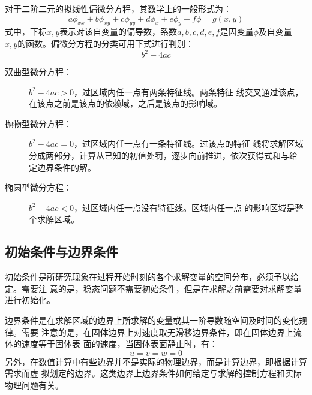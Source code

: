 对于二阶二元的拟线性偏微分方程，其数学上的一般形式为：
\begin{equation}
  a\phi_{xx} + b\phi_{xy} + c\phi_{yy} + d\phi_{x} + e\phi_{y} + f\phi = g(x,y)
\end{equation}
式中，下标$x,y$表示对该自变量的偏导数，系数$a,b,c,d,e,f$是因变量$\phi$及自变量
$x,y$的函数。偏微分方程的分类可用下式进行判别：
\begin{equation}
  b^{2} - 4ac
\end{equation}
\begin{description}
  \item  [双曲型微分方程：] $b^{2}-4ac>0$，过区域内任一点有两条特征线。两条特征
    线交叉通过该点，在该点之前是该点的依赖域，之后是该点的影响域。
  \item [抛物型微分方程：] $b^{2}-4ac=0$，过区域内任一点有一条特征线。过该点的特征
    线将求解区域分成两部分，计算从已知的初值处罚，逐步向前推进，依次获得式和与给
    定边界条件的解。
  \item [椭圆型微分方程：] $b^{2}-4ac<0$，过区域内任一点没有特征线。区域内任一点
    的影响区域是整个求解区域。
\end{description}

\subsection{初始条件与边界条件}
初始条件是所研究现象在过程开始时刻的各个求解变量的空间分布，必须予以给定。需要注
意的是，稳态问题不需要初始条件，但是在求解之前需要对求解变量进行初始化。

边界条件是在求解区域的边界上所求解的变量或其一阶导数随空间及时间的变化规律。需要
注意的是，在固体边界上对速度取无滑移边界条件，即在固体边界上流体的速度等于固体表
面的速度，当固体表面静止时，有：
\begin{equation}
u=v=w=0
\end{equation}
另外，在数值计算中有些边界并不是实际的物理边界，而是计算边界，即根据计算需求而虚
拟划定的边界。这类边界上边界条件如何给定与求解的控制方程和实际物理问题有关。
